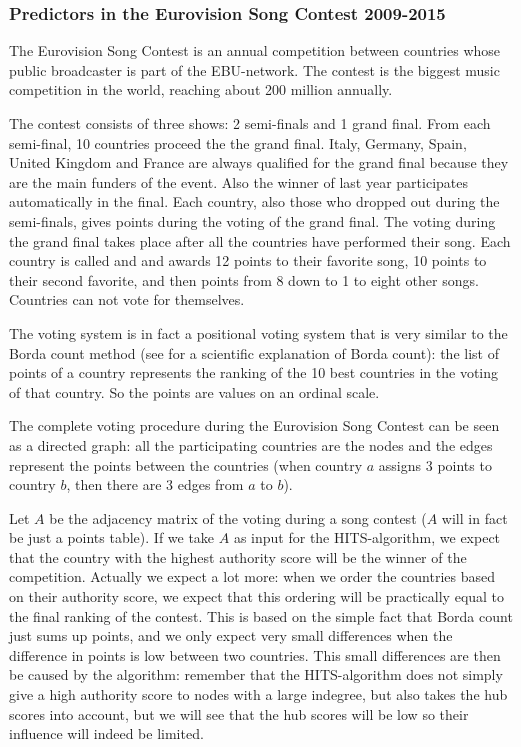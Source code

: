 \documentclass[a4paper,11pt]{report}
\begin{document}
 \subsubsection{Predictors in the Eurovision Song Contest 
 2009-2015}
 The Eurovision Song Contest is an annual competition between countries whose 
 public broadcaster is part of the EBU-network. The contest is the biggest music 
 competition in the world, reaching about 200 million annually.
  
 The contest consists of three shows: 2 semi-finals and 1 grand final. From each 
 semi-final, 10 countries proceed the the grand final. Italy, Germany, Spain, United Kingdom and France are 
 always qualified for the grand final because they are the main funders of the event. 
 Also the winner of last year participates automatically in the final. Each country, also those 
 who dropped out during the semi-finals, gives points during the voting of the grand final. 
The voting during the grand final takes place after all the countries have performed their song. 
Each country is called and and awards 12 points to their 
favorite song, 10 points to their second favorite, and then points from 8 down 
to 1 to eight other songs. Countries can not vote for themselves. 

The voting 
system is in fact a positional voting system that is very similar to the Borda count 
method (see \cite{saari} for a scientific explanation of Borda count): the list 
of points of a country represents the ranking of the 10 best countries in the voting of that country. 
So the points are values on an ordinal scale.

The complete voting procedure during the Eurovision Song Contest can be seen as 
a directed graph: all the participating countries are the nodes and the edges 
represent the points between the countries (when country $a$ assigns 3 points to country $b$, then there are 3 edges from $a$ to 
$b$).

Let $A$ be the adjacency matrix of the voting during a song contest ($A$ will in fact be just a points table). If we 
take $A$ as input for the HITS-algorithm, we expect that the country with the 
highest authority score will be the winner of the competition. Actually we 
expect a lot more: when we order the countries based on their authority score, 
we expect that this ordering will be practically equal to the final ranking of the contest. 
This is based on the simple fact that Borda count just sums up points, and we 
only expect very small differences when the difference in points is low between 
two countries. This small differences are then be caused by the algorithm: remember 
that the HITS-algorithm does not simply give a high authority score to nodes 
with a large indegree, but also takes the hub scores into account, but we will 
see that the hub scores will be low so their influence will indeed be limited.
\end{document}
